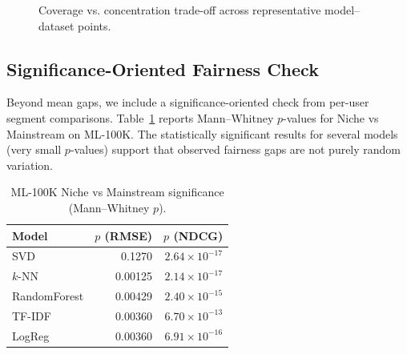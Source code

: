 \documentclass[conference]{IEEEtran}
\begin{document}
\begin{figure}[!t]
  \centering
  \caption{Coverage vs. concentration trade-off across representative model--dataset points.}
  \label{fig:tradeoff_scatter}
\end{figure}

\subsection{Significance-Oriented Fairness Check}

Beyond mean gaps, we include a significance-oriented check from per-user segment comparisons. Table~\ref{tab:significance} reports Mann--Whitney $p$-values for Niche vs Mainstream on ML-100K. The statistically significant results for several models (very small $p$-values) support that observed fairness gaps are not purely random variation.

\begin{table}[!t]
  \centering
  \caption{ML-100K Niche vs Mainstream significance (Mann--Whitney $p$).}
  \label{tab:significance}
  \begin{tabular}{@{}lrr@{}}
    \toprule
    \textbf{Model} & \textbf{$p$ (RMSE)} & \textbf{$p$ (NDCG)} \\
    \midrule
    SVD & 0.1270 & $2.64\times10^{-17}$ \\
    $k$-NN & 0.00125 & $2.14\times10^{-17}$ \\
    RandomForest & 0.00429 & $2.40\times10^{-15}$ \\
    TF-IDF & 0.00360 & $6.70\times10^{-13}$ \\
    LogReg & 0.00360 & $6.91\times10^{-16}$ \\
    \bottomrule
  \end{tabular}
\end{table}
\end{document}
